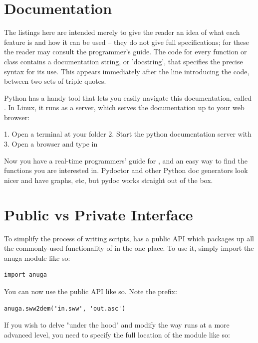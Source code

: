 \documentclass{manual}
\begin{document}
\section{Documentation}

The listings here are intended merely to give the reader an idea of what
each feature is and how it can be used -- they do
not give full specifications; for these the reader
may consult the programmer's guide. The code for every function or class contains
a documentation string, or 'docstring', that specifies the precise
syntax for its use. This appears immediately after the line
introducing the code, between two sets of triple quotes.

Python has a handy tool that lets you easily navigate this documentation,
called . In Linux, it runs as a server, which serves the
documentation up to your web browser:

1. Open a terminal at your  folder
2. Start the python documentation server with 
3. Open a browser and type in 

Now you have a real-time programmers' guide for \anuga, and an easy way to find 
the functions you are interested in. Pydoctor and other Python doc generators
look nicer and have graphs, etc, but pydoc works straight out of the box. 

\section{Public vs Private Interface}

To simplify the process of writing scripts, \anuga has a public API which packages
up all the commonly-used functionality of \anuga in the one place. To use it, simply
import the anuga module like so:

\begin{verbatim}
import anuga
\end{verbatim}

You can now use the public API like so. Note the  prefix:

\begin{verbatim}
anuga.sww2dem('in.sww', 'out.asc')
\end{verbatim}

If you wish to delve "under the hood" and modify the way \anuga runs at a more
advanced level, you need to specify the full location of the module like so:
\end{document}
